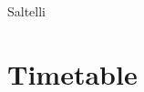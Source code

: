 \documentclass[a4paper,prd,twocolumn,nofootinbib,superscriptaddress,floatfix]{revtex4}
\begin{document}
Saltelli

\section{Timetable}

\end{document}
